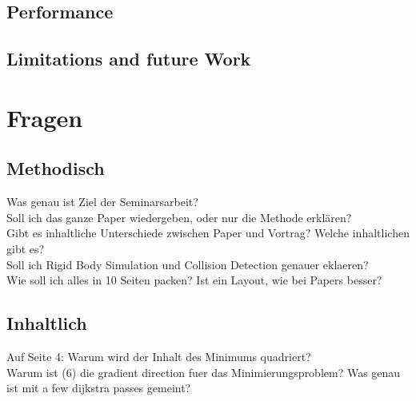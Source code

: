 \documentclass[
11pt, 
DIV10,
a4paper, 
oneside, 
headings=normal, 
captions=tableheading,
final, 
numbers=noenddot
]{scrartcl}
\begin{document}
	\subsection{Performance}
	\subsection{Limitations and  future Work}
	
\newpage
\section*{Fragen}
\subsection*{Methodisch}
Was genau ist Ziel der Seminarsarbeit?\\
Soll ich das ganze Paper wiedergeben, oder nur die Methode erklären?\\
Gibt es inhaltliche Unterschiede zwischen Paper und Vortrag? Welche inhaltlichen gibt es?\\
Soll ich Rigid Body Simulation und Collision Detection genauer eklaeren?\\
Wie soll ich alles in 10 Seiten packen? Ist ein Layout, wie bei Papers besser?
\subsection*{Inhaltlich}
Auf Seite 4: Warum wird der Inhalt des Minimums quadriert?\\
Warum ist (6) die gradient direction fuer das Minimierungsproblem?
Was genau ist mit a few dijkstra passes gemeint?
\end{document}

